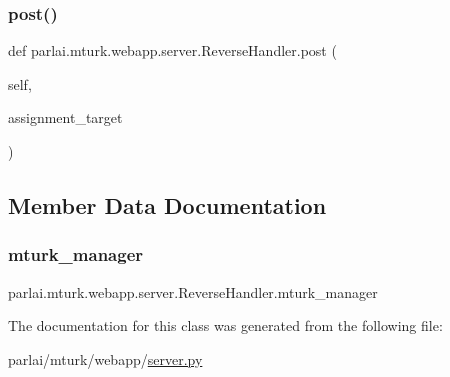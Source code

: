 \subsubsection{\texorpdfstring{post()}{post()}}
{\footnotesize\ttfamily def parlai.\+mturk.\+webapp.\+server.\+Reverse\+Handler.\+post (\begin{DoxyParamCaption}\item[{}]{self,  }\item[{}]{assignment\+\_\+target }\end{DoxyParamCaption})}



\subsection{Member Data Documentation}
\mbox{\label{classparlai_1_1mturk_1_1webapp_1_1server_1_1ReverseHandler_a60664e4d71da9169afe68bd7b4f8a801}} 
\subsubsection{\texorpdfstring{mturk\+\_\+manager}{mturk\_manager}}
{\footnotesize\ttfamily parlai.\+mturk.\+webapp.\+server.\+Reverse\+Handler.\+mturk\+\_\+manager}



The documentation for this class was generated from the following file\+:\begin{DoxyCompactItemize}
\item 
parlai/mturk/webapp/\hyperlink{server_8py}{server.\+py}\end{DoxyCompactItemize}
